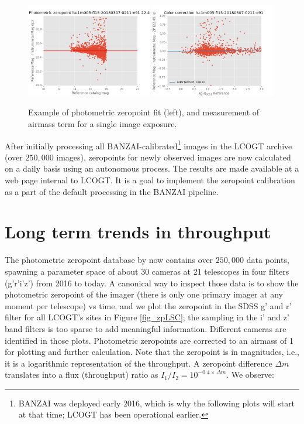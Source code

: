 \documentclass[]{spie}
\begin{document}
\begin{figure}
\centering
\includegraphics[width=0.49\textwidth]{images/example_zeropointfit.png} \hspace*{\fill}
\includegraphics[width=0.49\textwidth]{images/example_colortermfit.png} \\[1ex]
\caption{\label{fig_singleimageexample}Example of photometric zeropoint fit (left), and measurement of
airmass term for a single image exposure.}
\end{figure}

After initially processing all BANZAI-calibrated\footnote{BANZAI was deployed early 2016, which 
is why the following plots will start at that time; LCOGT has been operational earlier.} images 
in the LCOGT archive (over $250,000$ images), zeropoints for newly observed  images are now 
calculated on a daily basis using an autonomous process. The results  
are made available at a web page internal to LCOGT. It is a goal to implement the zeropoint 
calibration as a part of the default processing in the BANZAI pipeline.


\section{Long term trends in throughput}

The photometric zeropoint database by now contains over $250,000$ data points, spawning a parameter
space of about 30 cameras at 21 telescopes in four filters (g'r'i'z') from 2016 to today. A
canonical way to inspect those data is to show the photometric zeropoint of the imager (there is
only one primary imager at any moment per telescope) vs time, and we plot the zeropoint in the SDSS
g' and r' filter for all LCOGT's sites in Figure \ref{fig_zpLSC}; the sampling in the i' and z'
band filters is too sparse to add meaningful information. Different cameras are identified in those
plots. Photometric zeropoints are corrected to an airmass of 1 for plotting and further calculation.
Note that the zeropoint is in magnitudes, i.e., it is a logarithmic representation of the
throughput. A zeropoint difference $\Delta m$ translates into a flux (throughput) ratio as $I_1 /
I_2 = 10^{-0.4 \times \Delta m}$.  We observe:
\end{document}

